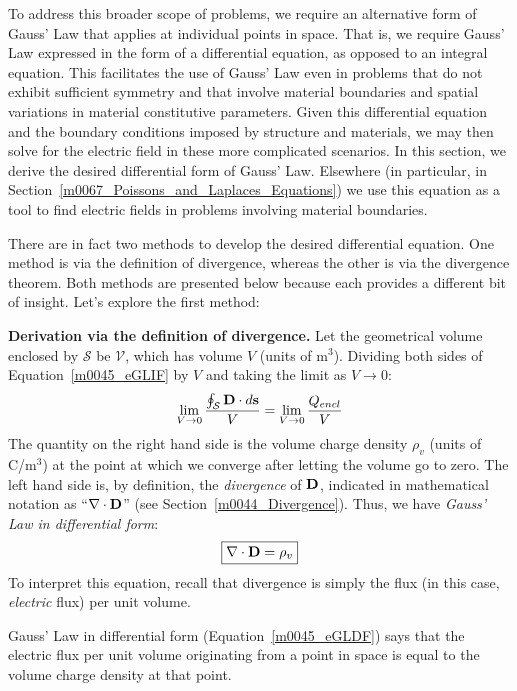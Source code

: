 To address this broader scope of problems, we require an alternative form of Gauss' Law that applies at individual points in space.
That is, we require Gauss' Law expressed in the form of a differential equation, as opposed to an integral equation.  
This facilitates the use of Gauss' Law even in problems that do not exhibit sufficient symmetry and that involve material boundaries and spatial variations in material constitutive parameters.
Given this differential equation and the boundary conditions imposed by structure and materials, we may then solve for the electric field in these more complicated scenarios.  In this section, we derive the desired differential form of Gauss' Law.
Elsewhere (in particular, in Section~\ref{m0067_Poissons_and_Laplaces_Equations}) we use this equation as a tool to find electric fields in problems involving material boundaries.   

There are in fact two methods to develop the desired differential equation.
One method is via the definition of divergence, whereas the other is via the divergence theorem.  
Both methods are presented below because each provides a different bit of insight.  Let's explore the first method:

{\bf Derivation via the definition of divergence.}
Let the geometrical volume enclosed by ${\mathcal S}$ be ${\mathcal V}$, which has volume $V$ (units of m$^3$).  
Dividing both sides of Equation~\ref{m0045_eGLIF} by $V$ and taking the limit as $V \to 0$:
%
\begin{equation}   
\lim_{V \to 0} \frac{ \oint_{\mathcal S}{ {\bf D} \cdot d{\bf s} } }{V} = \lim_{V \to 0} \frac{ Q_{encl} }{V}
\end{equation}
%
The quantity on the right hand side is the volume charge density $\rho_v$ (units of C/m$^3$) at the point at which we converge after letting the volume go to zero.  The left hand side is, by definition, the {\it divergence} of ${\bf D}$, indicated in mathematical notation as ``$\nabla \cdot {\bf D}$'' (see Section~\ref{m0044_Divergence}). Thus, we have \emph{Gauss' Law in differential form}:
%
\begin{equation}
\boxed{
\nabla \cdot {\bf D} = \rho_v
}
\label{m0045_eGLDF}
\end{equation}
%
To interpret this equation, recall that divergence is simply the flux (in this case, {\it electric} flux) per unit volume.  

\begin{mdframed}[backgroundcolor=yellow!20,nobreak=true] 
Gauss' Law in differential form (Equation~\ref{m0045_eGLDF}) says that the electric flux per unit volume originating from a point in space is equal to the volume charge density at that point.
\end{mdframed}
%

